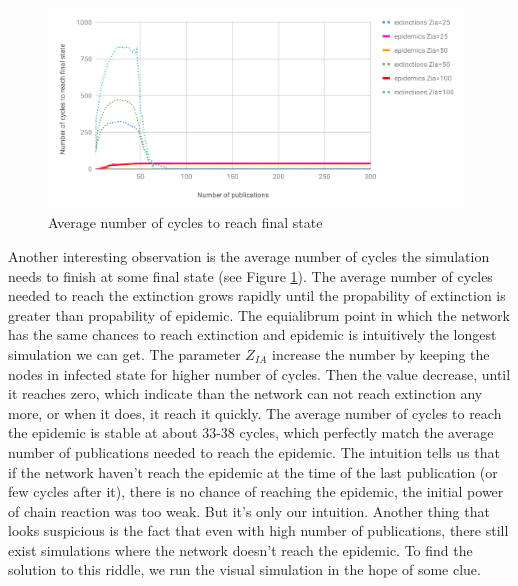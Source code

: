 \documentclass[nostrict]{szablonPG}
\begin{document}
\begin{figure}[h!]
    \includegraphics[width=11cm]{img/average-number-of-cycles-to-reach-final-state.png}
    \centering
    \caption{Average number of cycles to reach final state}
    \label{fig:average-number-of-cycles}
\end{figure}
Another interesting observation is the average number of cycles the simulation needs to finish at some final state (see Figure \ref{fig:average-number-of-cycles}). The average number of cycles needed to reach the extinction grows rapidly until the propability of extinction is greater than propability of epidemic. The equialibrum point in which the network has the same chances to reach extinction and epidemic is intuitively the longest simulation we can get. The parameter $Z_{IA}$ increase the number by keeping the nodes in infected state for higher number of cycles. Then the value decrease, until it reaches zero, which indicate than the network can not reach extinction any more, or when it does, it reach it quickly.
The average number of cycles to reach the epidemic is stable at about 33-38 cycles, which perfectly match the average number of publications needed to reach the epidemic. The intuition tells us that if the network haven't reach the epidemic at the time of the last publication (or few cycles after it), there is no chance of reaching the epidemic, the initial power of chain reaction was too weak. But it's only our intuition. Another thing that looks suspicious is the fact that even with high number of publications, there still exist simulations where the network doesn't reach the epidemic. To find the solution to this riddle, we run the visual simulation in the hope of some clue.
\end{document}
